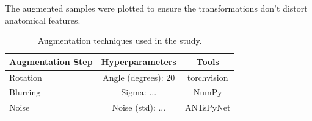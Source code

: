 
The augmented samples were plotted to ensure the transformations don't distort anatomical features.
\begin{center}
    \begin{table}
        \centering
        \caption{\label{tab:augmentation_pipeline}Augmentation techniques used in the study.}
        \begin{tabular*}{500pt}{@{\extracolsep\fill}lcc@{\extracolsep\fill}}
            \toprule
            \textbf{Augmentation Step} & \textbf{Hyperparameters} & \textbf{Tools} \\
            \midrule
            Rotation & Angle (degrees): 20 & torchvision \\
            Blurring & Sigma: ...  & NumPy \\
            Noise & Noise (std): ... & ANTsPyNet \\
            \bottomrule
            \end{tabular*}
    \end{table}
\end{center}
%





